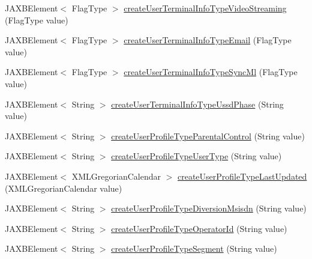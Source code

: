 \begin{DoxyCompactItemize}
JAXBElement$<$ FlagType $>$ \hyperlink{classcom_1_1telefonica_1_1schemas_1_1unica_1_1rest_1_1directory_1_1v1_1_1ObjectFactory_a38dc045158cf1292509eeffeb56d15fa}{createUserTerminalInfoTypeVideoStreaming} (FlagType value)
\item 
JAXBElement$<$ FlagType $>$ \hyperlink{classcom_1_1telefonica_1_1schemas_1_1unica_1_1rest_1_1directory_1_1v1_1_1ObjectFactory_aa364b3a3243dcbd750e442d3cfc0a292}{createUserTerminalInfoTypeEmail} (FlagType value)
\item 
JAXBElement$<$ FlagType $>$ \hyperlink{classcom_1_1telefonica_1_1schemas_1_1unica_1_1rest_1_1directory_1_1v1_1_1ObjectFactory_a4c72f13ac498fd9fedd897a158fce500}{createUserTerminalInfoTypeSyncMl} (FlagType value)
\item 
JAXBElement$<$ String $>$ \hyperlink{classcom_1_1telefonica_1_1schemas_1_1unica_1_1rest_1_1directory_1_1v1_1_1ObjectFactory_a08e0c1ec389e6217786befcf805fdc62}{createUserTerminalInfoTypeUssdPhase} (String value)
\item 
JAXBElement$<$ String $>$ \hyperlink{classcom_1_1telefonica_1_1schemas_1_1unica_1_1rest_1_1directory_1_1v1_1_1ObjectFactory_aeaa9c7ef5f595b90f0be20a497e10574}{createUserProfileTypeParentalControl} (String value)
\item 
JAXBElement$<$ String $>$ \hyperlink{classcom_1_1telefonica_1_1schemas_1_1unica_1_1rest_1_1directory_1_1v1_1_1ObjectFactory_a825234b30b48c2d2c96f3233705c4fff}{createUserProfileTypeUserType} (String value)
\item 
JAXBElement$<$ XMLGregorianCalendar $>$ \hyperlink{classcom_1_1telefonica_1_1schemas_1_1unica_1_1rest_1_1directory_1_1v1_1_1ObjectFactory_a9ac38302e06e97a1c0a744d6b02f7f3a}{createUserProfileTypeLastUpdated} (XMLGregorianCalendar value)
\item 
JAXBElement$<$ String $>$ \hyperlink{classcom_1_1telefonica_1_1schemas_1_1unica_1_1rest_1_1directory_1_1v1_1_1ObjectFactory_ac68474baaf2a680cf3fa19547962d39b}{createUserProfileTypeDiversionMsisdn} (String value)
\item 
JAXBElement$<$ String $>$ \hyperlink{classcom_1_1telefonica_1_1schemas_1_1unica_1_1rest_1_1directory_1_1v1_1_1ObjectFactory_a02078f32da732722db924c54e0d02ef1}{createUserProfileTypeOperatorId} (String value)
\item 
JAXBElement$<$ String $>$ \hyperlink{classcom_1_1telefonica_1_1schemas_1_1unica_1_1rest_1_1directory_1_1v1_1_1ObjectFactory_af52fde80b98514bec6586309f606b195}{createUserProfileTypeSegment} (String value)
\item 

\end{DoxyCompactItemize}
